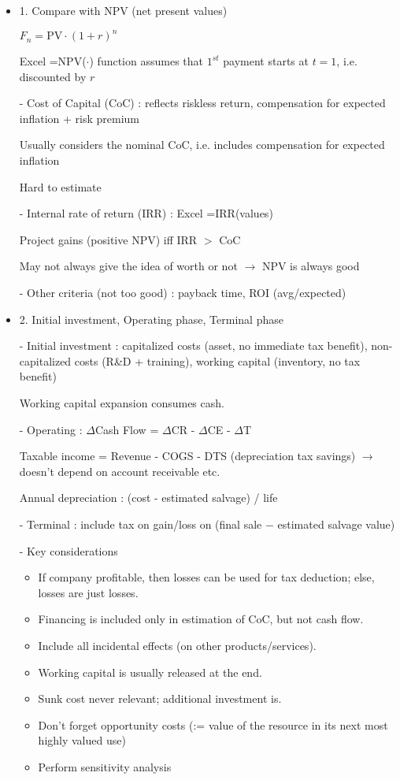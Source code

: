 \documentclass{article}
\begin{document}
\newpage
{}
\begin{itemize}
\item 1. Compare with NPV (net present values)

$F_n = \text{PV} \cdot (1+r)^{n}$

Excel =NPV($\cdot$) function assumes that $1^{st}$ payment starts at $t=1$, i.e. discounted by $r$

- Cost of Capital (CoC) : reflects riskless return, compensation for expected inflation + risk premium

Usually considers the nominal CoC, i.e. includes compensation for expected inflation

Hard to estimate

- Internal rate of return (IRR) : Excel =IRR(values)

Project gains (positive NPV) iff IRR $>$ CoC

May not always give the idea of worth or not $\rightarrow$ NPV is always good

- Other criteria (not too good) : payback time, ROI (avg/expected)


\item 2. Initial investment, Operating phase, Terminal phase

- Initial investment : capitalized costs (asset, no immediate tax benefit), non-capitalized costs (R\&D + training), working capital (inventory, no tax benefit)

Working capital expansion consumes cash.

- Operating : $\Delta$Cash Flow = $\Delta$CR - $\Delta$CE - $\Delta$T

Taxable income = Revenue - COGS - DTS (depreciation tax savings) $\rightarrow$ doesn't depend on account receivable etc.

Annual depreciation : (cost - estimated salvage) / life

- Terminal : include tax on gain/loss on (final sale $-$ estimated salvage value)

- Key considerations
	\begin{itemize}
	\item If company profitable, then losses can be used for tax deduction; else, losses are just losses.
	\item Financing is included only in estimation of CoC, but not cash flow.
	\item Include all incidental effects (on other products/services).
	\item Working capital is usually released at the end.
	\item Sunk cost never relevant; additional investment is.
	\item Don't forget opportunity costs (:= value of the resource in its next most highly valued use)
	\item Perform sensitivity analysis
	\end{itemize}



\end{itemize}
\end{document}
